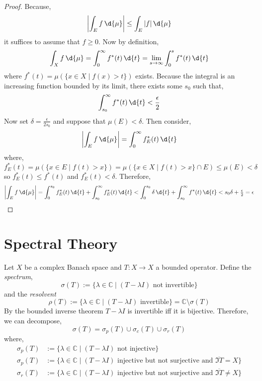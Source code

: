 \documentclass[12pt]{article}
\begin{document}
\begin{proof}
Because,
\[ \left| \int_E f \, \d{\mu} \right| \le \int_E |f| \, \d{\mu} \]
it suffices to assume that $f \ge 0$. Now by definition,
\[ \int_X f \, \d{\mu} = \int_0^\infty f^*(t) \, \d{t} = \lim_{s \to \infty} \int_0^{s} f^*(t) \, \d{t} \]
where $f^*(t) = \mu(\{ x \in X \mid f(x) > t \})$ exists. Because the integral is an increasing function bounded by its limit, there exists some $s_0$ such that,
\[ \int_{s_0}^\infty f^*(t) \, \d{t} < \frac{\epsilon}{2} \]
Now set $\delta = \frac{\epsilon}{2 s_0}$ and suppose that $\mu(E) < \delta$. Then consider,
\[ \left| \int_E f \, \d{\mu} \right| = \int_0^\infty f^*_E(t) \, \d{t} \]
where,
\[ f^*_E(t) = \mu(\{ x \in E \mid f(t) > x \}) = \mu(\{ x \in X \mid f(t) > x \} \cap E) \le \mu(E) < \delta \]
so $f_E^*(t) \le f^*(t)$ and $f_E^*(t) < \delta$. Therefore,
\[ \left| \int_E f \, \d{\mu} \right| = \int_0^{s_0} f_E^*(t) \, \d{t} + \int_{s_0}^\infty f_E^*(t) \, \d{t} < \int_0^{s_0} \delta \, \d{t} + \int_{s_0}^\infty f^*(t) \, \d{t} < s_0 \delta + \tfrac{\epsilon}{2} = \epsilon \]
\end{proof}


\section{Spectral Theory}

\renewcommand{\C}{\mathbb{C}}

\begin{defn}
Let $X$ be a complex Banach space and $T : X \to X$ a bounded operator. Define the \textit{spectrum},
\[ \sigma(T) := \{ \lambda \in \C \mid (T - \lambda I) \text{ not invertible} \} \]
and the \textit{resolvent}
\[ \rho(T) := \{ \lambda \in \C \mid (T - \lambda I) \text{ invertible} \} = \C \setminus \sigma(T) \]
By the bounded inverse theorem $T - \lambda I$ is invertible iff it is bijective. Therefore, we can decompose,
\[ \sigma(T) = \sigma_p(T) \cup \sigma_c(T) \cup \sigma_r(T) \]
where,
\begin{align*}
\sigma_p(T) & := \{ \lambda \in \C \mid (T - \lambda I) \text{ not injective} \}
\\
\sigma_p(T) & := \{ \lambda \in \C \mid (T - \lambda I) \text{ injective but not surjective and } \overline{\Im{T}} = X \}
\\
\sigma_r(T) & := \{ \lambda \in \C \mid (T - \lambda I) \text{ injective but not surjective and } \overline{\Im{T}} \neq X \}
\end{align*}
\end{defn}
\end{document}
